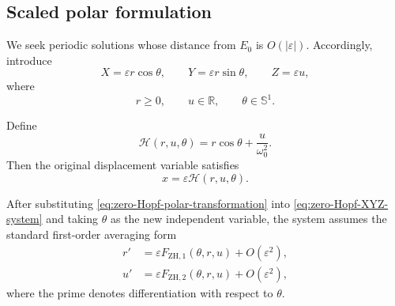 \documentclass[11pt,reqno]{amsart}
\theoremstyle{plain}
\theoremstyle{definition}
\theoremstyle{remark}
\begin{document}
\subsection{Scaled polar formulation}
\label{subsec:zero-Hopf-polar}

We seek periodic solutions whose distance from \(E_0\) is
\(O(|\varepsilon|)\). Accordingly, introduce
\begin{equation}
\label{eq:zero-Hopf-polar-transformation}
X
=
\varepsilon r\cos\theta,
\qquad
Y
=
\varepsilon r\sin\theta,
\qquad
Z
=
\varepsilon u,
\end{equation}
where
\[
r\geq0,
\qquad
u\in\mathbb R,
\qquad
\theta\in\mathbb S^1.
\]

Define
\begin{equation}
\label{eq:zero-Hopf-H-definition}
\mathcal H(r,u,\theta)
=
r\cos\theta+\frac{u}{\omega_0^2}.
\end{equation}
Then the original displacement variable satisfies
\[
x=\varepsilon\mathcal H(r,u,\theta).
\]

After substituting \eqref{eq:zero-Hopf-polar-transformation} into
\eqref{eq:zero-Hopf-XYZ-system} and taking \(\theta\) as the new
independent variable, the system assumes the standard first-order
averaging form
\begin{equation}
\label{eq:zero-Hopf-standard-averaging-form}
\begin{aligned}
r'
&=
\varepsilon
F_{\mathrm{ZH},1}(\theta,r,u)
+
O(\varepsilon^2),
\\[2mm]
u'
&=
\varepsilon
F_{\mathrm{ZH},2}(\theta,r,u)
+
O(\varepsilon^2),
\end{aligned}
\end{equation}
where the prime denotes differentiation with respect to \(\theta\).
\end{document}
